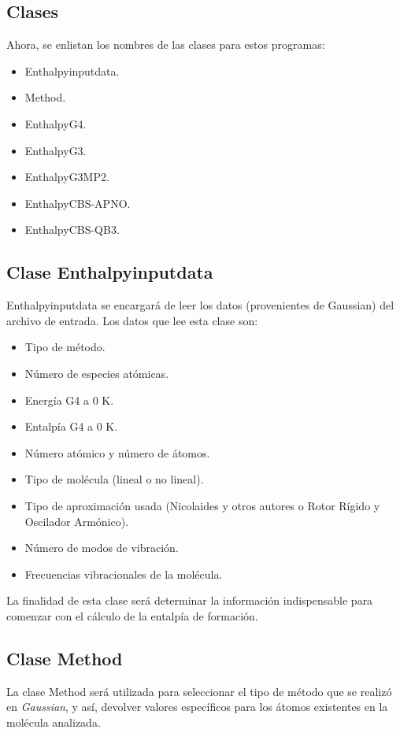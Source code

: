 \documentclass[12pt]{article}
\begin{document}
\subsection*{Clases}
Ahora, se enlistan los nombres de las clases para estos programas:
\begin{itemize}
	\item Enthalpyinputdata.
	\item Method.
	\item EnthalpyG4.
	\item EnthalpyG3.
	\item EnthalpyG3MP2.
	\item EnthalpyCBS-APNO.
	\item EnthalpyCBS-QB3.
\end{itemize}

\subsection*{Clase Enthalpyinputdata}
Enthalpyinputdata se encargará de leer los datos (provenientes de Gaussian) del archivo de entrada. Los datos que lee esta clase son:
\begin{itemize}
	\item Tipo de método.
	\item Número de especies atómicas.
	\item Energía G4 a 0 K.
	\item Entalpía G4 a 0 K.
	\item Número atómico y número de átomos.
	\item Tipo de molécula (lineal o no lineal).
	\item Tipo de aproximación usada (Nicolaides y otros autores o Rotor Rígido y Oscilador Armónico).
	\item Número de modos de vibración.
	\item Frecuencias vibracionales de la molécula.
\end{itemize}
La finalidad de esta clase será determinar la información indispensable para comenzar con el cálculo de la entalpía de formación. 

\subsection*{Clase Method}
La clase Method será utilizada para seleccionar el tipo de método que se realizó en \textit{Gaussian}, y así, devolver valores específicos para los átomos existentes en la molécula analizada.
\end{document}
